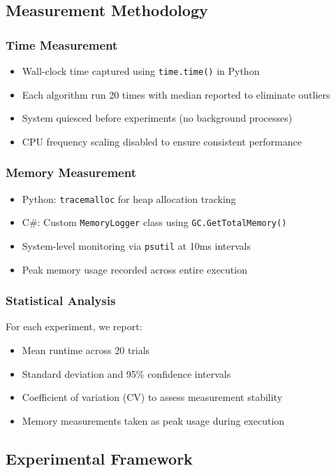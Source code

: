 \documentclass[11pt]{article}
\theoremstyle{definition}
\begin{document}
\subsection{Measurement Methodology}

\subsubsection{Time Measurement}
\begin{itemize}
\item Wall-clock time captured using \texttt{time.time()} in Python
\item Each algorithm run 20 times with median reported to eliminate outliers
\item System quiesced before experiments (no background processes)
\item CPU frequency scaling disabled to ensure consistent performance
\end{itemize}

\subsubsection{Memory Measurement}
\begin{itemize}
\item Python: \texttt{tracemalloc} for heap allocation tracking
\item C\#: Custom \texttt{MemoryLogger} class using \texttt{GC.GetTotalMemory()}
\item System-level monitoring via \texttt{psutil} at 10ms intervals
\item Peak memory usage recorded across entire execution
\end{itemize}

\subsubsection{Statistical Analysis}
For each experiment, we report:
\begin{itemize}
\item Mean runtime across 20 trials
\item Standard deviation and 95\% confidence intervals
\item Coefficient of variation (CV) to assess measurement stability
\item Memory measurements taken as peak usage during execution
\end{itemize}

\subsection{Experimental Framework}
\end{document}
